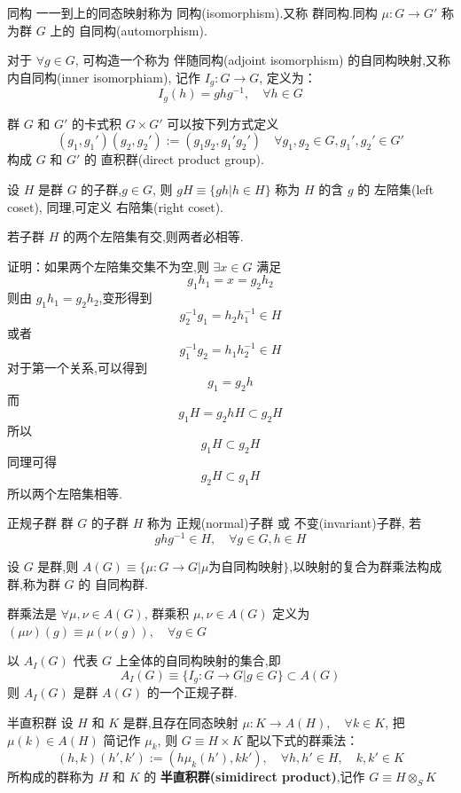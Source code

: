 \documentclass[../main.tex]{subfiles}
\begin{document}
\begin{definition}{}{同构}
	一一到上的同态映射称为 同构(isomorphism).又称 群同构.同构 $\mu:G\rightarrow G'$ 称为群 $G$ 上的 自同构(automorphism).
\end{definition}
 对于 $\forall g\in G$, 可构造一个称为 伴随同构(adjoint isomorphism) 的自同构映射,又称 内自同构(inner isomorphiam), 记作 $I_g : G \rightarrow G$, 定义为：
     $$
     I_g(h) = ghg^{-1},\quad \forall h \in G
     $$
 \begin{definition}{}{}
 群 $G$ 和 $G'$ 的卡式积 $G\times G'$ 可以按下列方式定义
     $$
     (g_1, g_1') (g_2, g_2') :=(g_1g_2, g_1'g_2')\quad\forall g_1, g_2\in G, g_1', g_2'\in G' 
     $$
 构成 $G$ 和 $G'$ 的 直积群(direct product group).
 \end{definition}
 \begin{definition}
     设 $H$ 是群 $G$ 的子群,$g\in G$, 则 $gH \equiv \{gh|h\in H\}$ 称为 $H$ 的含 $g$ 的 左陪集(left coset), 同理,可定义 右陪集(right coset).
 \end{definition}
 \begin{note}
     若子群 $H$ 的两个左陪集有交,则两者必相等.
 \end{note}
    \noindent
     证明：如果两个左陪集交集不为空,则 $\exists x \in G$ 满足
    $$
     g_1h_1 = x = g_2h_2
     $$
     则由 $g_1h_1 =g_2h_2$,变形得到
     $$
     g_2^{-1} g_1 = h_2h_1^{-1} \in H
     $$
     或者
     $$
     g_1^{-1}g_2 = h_1h_2^{-1} \in H
     $$
     对于第一个关系,可以得到
     $$
     g_1 = g_2h
     $$
     而 
     $$
     g_1H = g_2hH \subset g_2H
     $$
     所以 
     $$
     g_1H\subset g_2H
     $$
     同理可得
     $$
     g_2H \subset g_1H
     $$
      所以两个左陪集相等.
\begin{definition}{}{正规子群}
	群 $G$ 的子群 $H$ 称为 正规(normal)子群 或 不变(invariant)子群, 若
	$$
		ghg^{-1} \in H,\quad \forall g \in G, h\in H
	$$
\end{definition}
 \begin{definition}
      设 $G$ 是群,则 $A(G)\equiv \{\mu:G\rightarrow G|\mu\text{为自同构映射}\}$,以映射的复合为群乘法构成群,称为群 $G$ 的 自同构群.

     群乘法是 $\forall \mu,\nu \in A(G)$, 群乘积 $\mu,\nu \in A(G)$ 定义为 $(\mu\nu)(g) \equiv \mu(\nu(g)),\quad \forall g \in G$
 \end{definition}
 \begin{theorem}
     以 $A_I(G)$ 代表 $G$ 上全体的自同构映射的集合,即
     $$
     A_I(G)\equiv\{I_g: G\rightarrow G|g \in G\}\subset A(G)
     $$
 则 $A_I(G)$ 是群 $A(G)$ 的一个正规子群.
 \end{theorem}
 \begin{definition}{}{半直积群}
 设 $H$ 和 $K$ 是群,且存在同态映射 $\mu:K\rightarrow A(H),\quad \forall k \in K$, 把 $\mu(k)\in A(H)$ 简记作 $\mu_k$, 则 $G\equiv H\times K$ 配以下式的群乘法：
     $$
     (h, k)(h', k'):=(h\mu_k(h'), kk'),\quad\forall h, h'\in H,\quad k, k' \in K
     $$
 所构成的群称为 $H$ 和 $K$ 的 \textbf{半直积群(simidirect product)},记作 $G\equiv H\otimes_{S}K$
 \end{definition}
\end{document}
